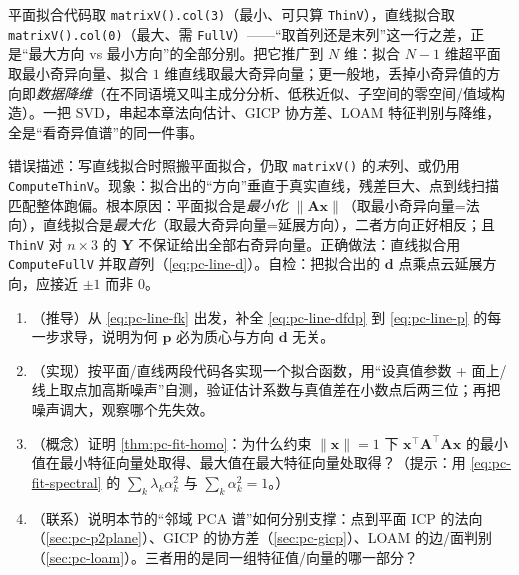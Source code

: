 \begin{insight}
平面拟合代码取 \texttt{matrixV().\allowbreak col(3)}（最小、可只算 \texttt{ThinV}），直线拟合取 \texttt{matrixV().\allowbreak col(0)}（最大、需 \texttt{FullV}）——“取首列还是末列”这一行之差，正是“最大方向 vs 最小方向”的全部分别。把它推广到 $N$ 维：拟合 $N\!-\!1$ 维超平面取最小奇异向量、拟合 $1$ 维直线取最大奇异向量；更一般地，丢掉小奇异值的方向即\emph{数据降维}（在不同语境又叫主成分分析、低秩近似、子空间的零空间/值域构造）。一把 SVD，串起本章法向估计、GICP 协方差、LOAM 特征判别与降维，全是“看奇异值谱”的同一件事。
\end{insight}

\begin{pitfall}
错误描述：写直线拟合时照搬平面拟合，仍取 \texttt{matrixV()} 的\emph{末}列、或仍用 \texttt{ComputeThinV}。现象：拟合出的“方向”垂直于真实直线，残差巨大、点到线扫描匹配整体跑偏。根本原因：平面拟合是\emph{最小化} $\|\mathbf{A}\mathbf{x}\|$（取最小奇异向量=法向），直线拟合是\emph{最大化}（取最大奇异向量=延展方向），二者方向正好相反；且 \texttt{ThinV} 对 $n\times3$ 的 $\mathbf{Y}$ 不保证给出全部右奇异向量。正确做法：直线拟合用 \texttt{ComputeFullV} 并取\emph{首}列（\cref{eq:pc-line-d}）。自检：把拟合出的 $\mathbf{d}$ 点乘点云延展方向，应接近 $\pm1$ 而非 $0$。
\end{pitfall}

\begin{practice}
\begin{enumerate}
  \item （推导）从 \cref{eq:pc-line-fk} 出发，补全 \cref{eq:pc-line-dfdp} 到 \cref{eq:pc-line-p} 的每一步求导，说明为何 $\mathbf{p}$ 必为质心与方向 $\mathbf{d}$ 无关。
  \item （实现）按平面/直线两段代码各实现一个拟合函数，用“设真值参数 + 面上/线上取点加高斯噪声”自测，验证估计系数与真值差在小数点后两三位；再把噪声调大，观察哪个先失效。
  \item （概念）证明 \cref{thm:pc-fit-homo}：为什么约束 $\|\mathbf{x}\|=1$ 下 $\mathbf{x}^\top\mathbf{A}^\top\mathbf{A}\mathbf{x}$ 的最小值在最小特征向量处取得、最大值在最大特征向量处取得？（提示：用 \cref{eq:pc-fit-spectral} 的 $\sum_k\lambda_k\alpha_k^2$ 与 $\sum_k\alpha_k^2=1$。）
  \item （联系）说明本节的“邻域 PCA 谱”如何分别支撑：点到平面 ICP 的法向（\cref{sec:pc-p2plane}）、GICP 的协方差（\cref{sec:pc-gicp}）、LOAM 的边/面判别（\cref{sec:pc-loam}）。三者用的是同一组特征值/向量的哪一部分？
\end{enumerate}
\end{practice}


